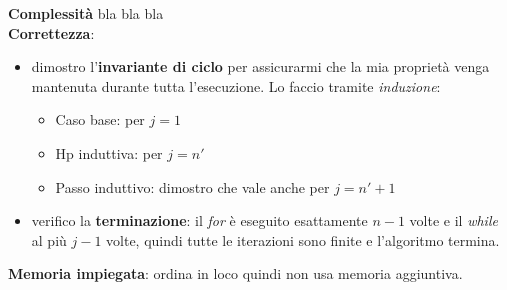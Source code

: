 \textbf{Complessità} bla bla bla\\ %
\textbf{Correttezza}:
\begin{itemize}
	\item dimostro l'\textbf{invariante di ciclo} per assicurarmi che la mia proprietà venga mantenuta durante tutta l'esecuzione. Lo faccio tramite \emph{induzione}:
	\begin{itemize}
		\item Caso base: per $j=1$
		\item Hp induttiva: per $j=n'$
		\item Passo induttivo: dimostro che vale anche per $j=n'+1$
	\end{itemize}
	\item verifico la \textbf{terminazione}: il \emph{for} è eseguito esattamente $n-1$ volte e il \emph{while} al più $j-1$ volte, quindi tutte le iterazioni sono finite e l'algoritmo termina.
\end{itemize}
\textbf{Memoria impiegata}: ordina in loco quindi non usa memoria aggiuntiva.

